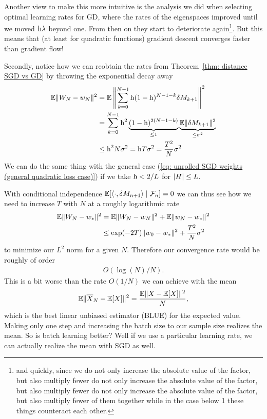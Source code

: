 Another view to make this more intuitive is the analysis we did when selecting
optimal learning rates for GD, where the rates of the eigenspaces improved until
we moved \(\text{h}\lambda\) beyond one. From then on they start to deteriorate
again\footnote{
	and quickly, since we
	do not only increase the absolute value of the factor, but also multiply fewer 
do not only increase the absolute value of the factor, but also multiply fewer 
	do not only increase the absolute value of the factor, but also multiply fewer 
	of them together while in the case below 1 these things counteract each other.
}.
But this means that (at least for quadratic functions) gradient descent
converges faster than gradient flow!

Secondly, notice how we can reobtain the rates from Theorem~\ref{thm: distance
SGD vs GD} by throwing the exponential decay away
\begin{align*}
	\mathbb{E}\|W_N-w_N\|^2
	&= \mathbb{E}\left\|\sum_{k=0}^{N-1}\text{h}(1-\text{h})^{N-1-k}\delta M_{k+1}\right\|^2\\
	&= \sum_{k=0}^{N-1}\text{h}^2\underbrace{(1-\text{h})^{2(N-1-k)}}_{\le1}
	\underbrace{\mathbb{E}\|\delta M_{k+1}\|^2}_{\le \sigma^2}\\
	&\le \text{h}^2 N \sigma^2 = \text{h} T\sigma^2 = \frac{T^2}{N}\sigma^2
\end{align*}
We can do the same thing with the general case (\ref{eq: unrolled SGD weights
(general quadratic loss case)}) if we take \(\text{h}<2/L\) for \(|H|\le L\).

With conditional independence \(\mathbb{E}[\langle \cdot, \delta M_{n+1}\rangle\mid\mathcal{F}_n]=0\)
we can thus see how we need to increase \(T\) with \(N\) at a roughly
logarithmic rate
\begin{align*}
	\mathbb{E}\|W_N - w_*\|^2
	&= \mathbb{E}\|W_N - w_N\|^2 +\mathbb{E}\|w_N - w_*\|^2\\
	&\le \exp(-2T)\|w_0 - w_*\|^2 + \frac{T^2}{N}\sigma^2
\end{align*}
to minimize our \(L^2\) norm for a given \(N\). Therefore our convergence rate
would be roughly of order
\begin{align*}
	O(\log(N)/N).
\end{align*}
This is a bit worse than the rate \(O(1/N)\) we can achieve with the mean
\begin{align*}
	\mathbb{E}\|\overline{X}_N - \mathbb{E}[X]\|^2 = \frac{\mathbb{E}\|X-\mathbb{E}[X]\|^2}{N},
\end{align*}
which is the best linear unbiased estimator (BLUE) for the expected value.
Making only one step and increasing the batch size to our sample size realizes
the mean. So is batch learning better? Well if we use a particular learning rate,
we can actually realize the mean with SGD as well.

